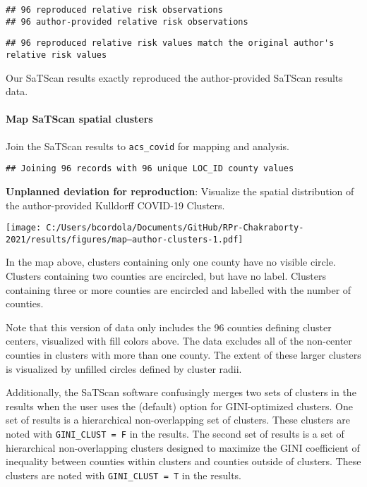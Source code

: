 \documentclass[
]{article}
\begin{document}
\begin{verbatim}
## 96 reproduced relative risk observations
## 96 author-provided relative risk observations
\end{verbatim}

\begin{verbatim}
## 96 reproduced relative risk values match the original author's relative risk values
\end{verbatim}

Our SaTScan results exactly reproduced the author-provided SaTScan
results data.

\hypertarget{map-satscan-spatial-clusters}{%
\paragraph{Map SaTScan spatial
clusters}\label{map-satscan-spatial-clusters}}

Join the SaTScan results to \texttt{acs\_covid} for mapping and
analysis.

\begin{verbatim}
## Joining 96 records with 96 unique LOC_ID county values
\end{verbatim}

\textbf{Unplanned deviation for reproduction}: Visualize the spatial
distribution of the author-provided Kulldorff COVID-19 Clusters.

\texttt{[image: C:/Users/bcordola/Documents/GitHub/RPr-Chakraborty-2021/results/figures/map--author-clusters-1.pdf]}

In the map above, clusters containing only one county have no visible
circle. Clusters containing two counties are encircled, but have no
label. Clusters containing three or more counties are encircled and
labelled with the number of counties.

Note that this version of data only includes the 96 counties defining
cluster centers, visualized with fill colors above. The data excludes
all of the non-center counties in clusters with more than one county.
The extent of these larger clusters is visualized by unfilled circles
defined by cluster radii.

Additionally, the SaTScan software confusingly merges two sets of
clusters in the results when the user uses the (default) option for
GINI-optimized clusters. One set of results is a hierarchical
non-overlapping set of clusters. These clusters are noted with
\texttt{GINI\_CLUST\ =\ F} in the results. The second set of results is
a set of hierarchical non-overlapping clusters designed to maximize the
GINI coefficient of inequality between counties within clusters and
counties outside of clusters. These clusters are noted with
\texttt{GINI\_CLUST\ =\ T} in the results.
\end{document}
